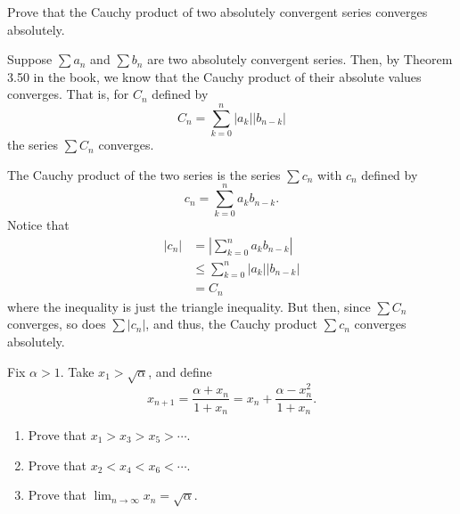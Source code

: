 \documentclass[12 pt, letterpaper]{hmcpset}
\begin{document}
\pagebreak

\begin{problem}
	Prove that the Cauchy product of two absolutely convergent series converges absolutely.
\end{problem}

\begin{solution}
	Suppose $\sum a_{n}$ and $\sum b_{n}$ are two absolutely convergent series. Then, by Theorem 3.50 in the book, we know that the Cauchy product of their absolute values converges. That is, for $C_{n}$ defined by
	\[
		C_{n} = \sum_{k = 0}^{n} \lvert a_{k} \rvert \lvert b_{n - k} \rvert
	\]
	the series $\sum C_{n}$ converges.

	The Cauchy product of the two series is the series $\sum c_{n}$ with $c_{n}$ defined by
	\[
		c_{n} = \sum_{k = 0}^{n} a_{k} b_{n - k}.
	\]
	Notice that
	\[
		\begin{split}
			\lvert c_{n} \rvert & = \left \lvert \sum_{k = 0}^{n} a_{k} b_{n - k} \right \rvert \\
					    & \le \sum_{k = 0}^{n} \lvert a_{k} \rvert \lvert b_{n - k} \rvert \\
					    & = C_{n}
		\end{split}
	\]
	where the inequality is just the triangle inequality. But then, since $\sum C_{n}$ converges, so does $\sum \lvert c_{n} \rvert$, and thus, the Cauchy product $\sum c_{n}$ converges absolutely.
\end{solution}

\pagebreak

\begin{problem}
	Fix $\alpha > 1$. Take $x_{1} > \sqrt{\alpha}$, and define
	\[
		x_{n + 1} = \frac{\alpha + x_{n}}{1 + x_{n}} = x_{n} + \frac{\alpha - x_{n}^{2}}{1 + x_{n}}.
	\]
	\begin{enumerate}
		\item Prove that $x_{1} > x_{3} > x_{5} > \cdots$.
		\item Prove that $x_{2} < x_{4} < x_{6} < \cdots$.
		\item Prove that $\lim_{n \to \infty} x_{n} = \sqrt{\alpha}$.
	\end{enumerate}
\end{problem}
\end{document}
